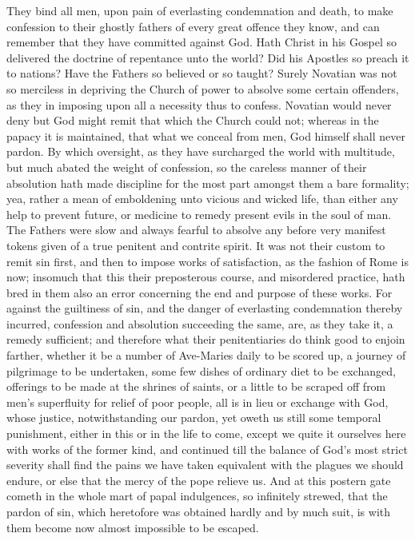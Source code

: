 They bind all men, upon pain of everlasting condemnation and death, to make confession to their ghostly fathers of every great offence they know, and can remember that they have committed against God. Hath Christ in his Gospel so delivered the doctrine of repentance unto the world? Did his Apostles so preach it to nations? Have the Fathers so believed or so taught? Surely Novatian was not so merciless in depriving the Church of power to absolve some certain offenders, as they in imposing upon all a necessity thus to confess. Novatian would never deny but God might remit that which the Church could not; whereas in the papacy it is maintained, that what we conceal from men, God himself shall never pardon. By which oversight, as they have surcharged the world with multitude, but much abated the weight of confession, so the careless manner of their absolution hath made discipline for the most part amongst them a bare formality; yea, rather a mean of emboldening unto vicious and wicked life, than either any help to prevent future, or medicine to remedy present evils in the soul of man. The Fathers were slow and always fearful to absolve any before very manifest tokens given of a true penitent and contrite spirit. It was not their custom to remit sin first, and then to impose works of satisfaction, as the fashion of Rome is now; insomuch that this their preposterous course, and misordered practice, hath bred in them also an error concerning the end and purpose of these works. For against the guiltiness of sin, and the danger of everlasting condemnation thereby incurred, confession and absolution succeeding the same, are, as they take it, a remedy sufficient; and therefore what their penitentiaries do think good to enjoin farther,  whether it be a number of Ave-Maries daily to be scored up, a journey of pilgrimage to be undertaken, some few dishes of ordinary diet to be exchanged, offerings to be made at the shrines of saints, or a little to be scraped off from men’s superfluity for relief of poor people, all is in lieu or exchange with God, whose justice, notwithstanding our pardon, yet oweth us still some temporal punishment, either in this or in the life to come, except we quite it ourselves here with works of the former kind, and continued till the balance of God’s most strict severity shall find the pains we have taken equivalent with the plagues we should endure, or else that the mercy of the pope relieve us. And at this postern gate cometh in the whole mart of papal indulgences, so infinitely strewed, that the pardon of sin, which heretofore was obtained hardly and by much suit, is with them become now almost impossible to be escaped.

